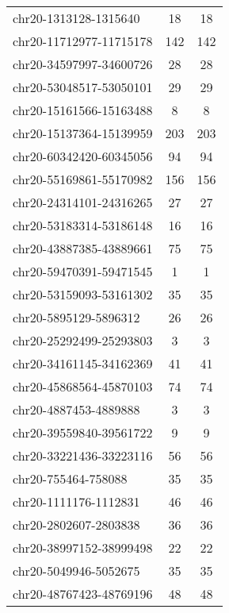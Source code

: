 \documentclass[10pt,letterpaper]{article}
\begin{document}
{\begin{longtable}{lSS}
	chr20-1313128-1315640   & 18     & 18                    \\
	chr20-11712977-11715178 & 142    & 142                   \\
	chr20-34597997-34600726 & 28     & 28                    \\
	chr20-53048517-53050101 & 29     & 29                    \\
	chr20-15161566-15163488 & 8      & 8                     \\
	chr20-15137364-15139959 & 203    & 203                   \\
	chr20-60342420-60345056 & 94     & 94                    \\
	chr20-55169861-55170982 & 156    & 156                   \\
	chr20-24314101-24316265 & 27     & 27                    \\
	chr20-53183314-53186148 & 16     & 16                    \\
	chr20-43887385-43889661 & 75     & 75                    \\
	chr20-59470391-59471545 & 1      & 1                     \\
	chr20-53159093-53161302 & 35     & 35                    \\
	chr20-5895129-5896312   & 26     & 26                    \\
	chr20-25292499-25293803 & 3      & 3                     \\
	chr20-34161145-34162369 & 41     & 41                    \\
	chr20-45868564-45870103 & 74     & 74                    \\
	chr20-4887453-4889888   & 3      & 3                     \\
	chr20-39559840-39561722 & 9      & 9                     \\
	chr20-33221436-33223116 & 56     & 56                    \\
	chr20-755464-758088     & 35     & 35                    \\
	chr20-1111176-1112831   & 46     & 46                    \\
	chr20-2802607-2803838   & 36     & 36                    \\
	chr20-38997152-38999498 & 22     & 22                    \\
	chr20-5049946-5052675   & 35     & 35                    \\
	chr20-48767423-48769196 & 48     & 48                    \\

\end{longtable}}
\end{document}
